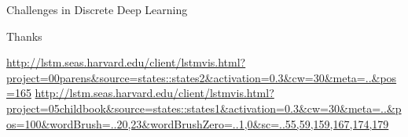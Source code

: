 \begin{frame}{Challenges in Discrete Deep Learning}
  
\end{frame}




\begin{frame}
  Thanks
\end{frame}



\begin{frame}
  \url{http://lstm.seas.harvard.edu/client/lstmvis.html?project=00parens&source=states::states2&activation=0.3&cw=30&meta=..&pos=165}
  \url{http://lstm.seas.harvard.edu/client/lstmvis.html?project=05childbook&source=states::states1&activation=0.3&cw=30&meta=..&pos=100&wordBrush=..20,23&wordBrushZero=..1,0&sc=..55,59,159,167,174,179}

\end{frame}